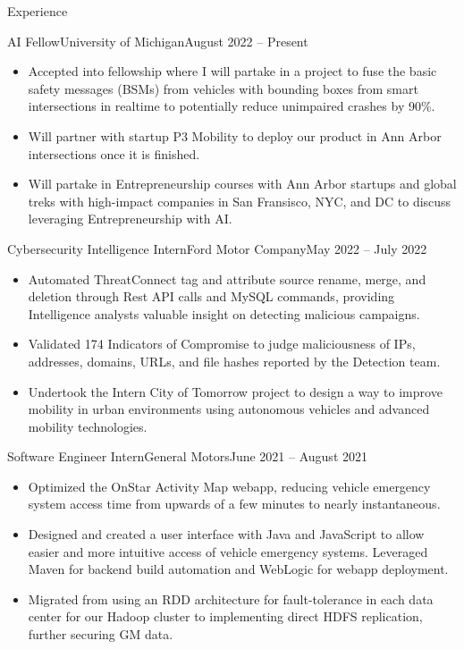 \documentclass[]{mcdowellcv}
\begin{document}
	\begin{cvsection}{Experience}
		\begin{cvsubsection}{AI Fellow}{University of Michigan}{August 2022 -- Present}
			\small{
				\begin{itemize}
					\item Accepted into fellowship where I will partake in a project to fuse the basic safety messages (BSMs) from vehicles with bounding boxes from smart intersections in realtime to potentially reduce unimpaired crashes by 90\%.
					\item Will partner with startup P3 Mobility to deploy our product in Ann Arbor intersections once it is finished.
					\item Will partake in Entrepreneurship courses with Ann Arbor startups and global treks with high-impact companies in San Fransisco, NYC, and DC to discuss leveraging Entrepreneurship with AI.
				\end{itemize}
			}
		\end{cvsubsection}
		
		\begin{cvsubsection}{Cybersecurity Intelligence Intern}{Ford Motor Company}{May 2022 -- July 2022}
			\small{
				\begin{itemize}
					\item Automated ThreatConnect tag and attribute source rename, merge, and deletion through Rest API calls and MySQL commands, providing Intelligence analysts valuable insight on detecting malicious campaigns.
					\item Validated 174 Indicators of Compromise to judge maliciousness of IPs, addresses, domains, URLs, and file hashes reported by the Detection team.
					\item Undertook the Intern City of Tomorrow project to design a way to improve mobility in urban environments using autonomous vehicles and advanced mobility technologies.
				\end{itemize}
			}
		\end{cvsubsection}
		
		\begin{cvsubsection}{Software Engineer Intern}{General Motors}{June 2021 -- August 2021}
			\small{
				\begin{itemize}
					\item Optimized the OnStar Activity Map webapp, reducing vehicle emergency system access time from upwards of a few minutes to nearly instantaneous.
					\item Designed and created a user interface with Java and JavaScript to allow easier and more intuitive access of vehicle emergency systems. Leveraged Maven for backend build automation and WebLogic for webapp deployment.
					\item Migrated from using an RDD architecture for fault-tolerance in each data center for our Hadoop cluster to implementing direct HDFS replication, further securing GM data.
				\end{itemize}
			}
		\end{cvsubsection}
		

\end{cvsection}
\end{document}
